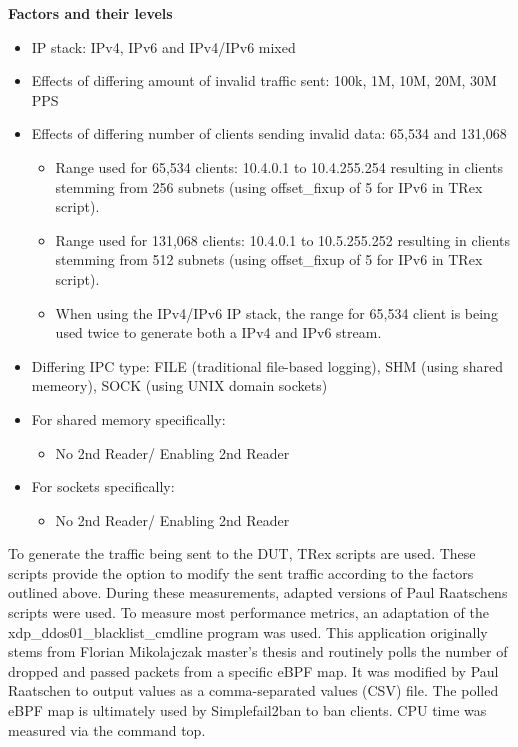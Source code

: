 \bigskip
\noindent
\textbf{Factors and their levels}
\begin{itemize}
    \item \ac{IP} stack: IPv4, IPv6 and IPv4/IPv6 mixed
    \item Effects of differing amount of invalid traffic sent: 100k, 1M, 10M, 20M, 30M \ac{PPS}
    \item Effects of differing number of clients sending invalid data: 65,534 and 131,068
    \begin{itemize}
        \item Range used for 65,534 clients: 10.4.0.1 to 10.4.255.254 resulting in clients stemming from 256 subnets (using offset\_fixup of 5 for IPv6 in TRex script).
        \item Range used for 131,068 clients: 10.4.0.1 to 10.5.255.252 resulting in clients stemming from 512 subnets (using offset\_fixup of 5 for IPv6 in TRex script).
        \item When using the IPv4/IPv6 \ac{IP} stack, the range for 65,534 client is being used twice to generate both a IPv4 and IPv6 stream.
    \end{itemize}
    \item Differing \ac{IPC} type\@: FILE (traditional file-based logging), SHM (using shared memeory), SOCK (using UNIX domain sockets)
    \item For shared memory specifically:
    \begin{itemize}
        \item No 2nd Reader/ Enabling 2nd Reader
    \end{itemize}
    \item For sockets specifically:
    \begin{itemize}
        \item No 2nd Reader/ Enabling 2nd Reader
    \end{itemize}
\end{itemize}

\bigskip
\noindent
To generate the traffic being sent to the \ac{DUT}, TRex scripts are used.
These scripts provide the option to modify the sent traffic according to the factors outlined above.
During these measurements, adapted versions of Paul Raatschens\cite{raatschen:ipc} scripts were used.
To measure most performance metrics, an adaptation of the xdp\_ddos01\_blacklist\_cmdline program was used.
This application originally stems from Florian Mikolajczak master's thesis\cite{mikolajczak:ebpf} and routinely polls the number of dropped and passed packets from a specific \ac{eBPF} map.
It was modified by Paul Raatschen to output values as a comma-separated values (CSV) file.
The polled \ac{eBPF} map is ultimately used by Simplefail2ban to ban clients.
\ac{CPU} time was measured via the command top.

